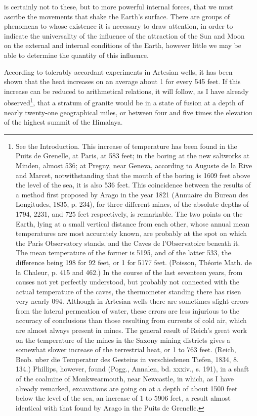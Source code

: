 is certainly not to these, but to more powerful internal forces, that we must ascribe the movements that shake the Earth's surface. There are groups of phenomena to whose existence it is necessary to draw attention, in order to indicate the universality of the influence of the attraction of the Sun and Moon on the external and internal conditions of the Earth, however little we may be able to determine the quantity of this influence.

According to tolerably accordant experiments in Artesian wells, it has been shown that the heat increases on an average about 1 for every 545 feet. If this increase can be reduced to arithmetical relations, it will follow, as I have already observed\footnote{See the Introduction. This increase of temperature has been found in the Puits de Grenelle, at Paris, at 583 feet; in the boring at the new saltworks at Minden, almost 536; at Pregny, near Geneva, according to Auguste de la Rive and Marcet, notwithstanding that the mouth of the boring is 1609 feet above the level of the sea, it is also 536 feet. This coincidence between the results of a method first proposed by Arago in the year 1821 (Annuaire du Bureau des Longitudes, 1835, p. 234), for three different mines, of the absolute depths of 1794, 2231, and 725 feet respectively, is remarkable. The two points on the Earth, lying at a small vertical distance from each other, whose annual mean temperatures are most accurately known, are probably at the spot on which the Paris Observatory stands, and the Caves de l'Observatoire beneath it. The mean temperature of the former is 5195, and of the latter 533, the difference being 198 for 92 feet, or 1 for 5177 feet. (Poisson, Th\'{e}orie Math. de la Chaleur, p. 415 and 462.) In the course of the last seventeen years, from causes not yet perfectly understood, but probably not connected with the actual temperature of the caves, the thermometer standing there has risen very nearly 094. Although in Artesian wells there are sometimes slight errors from the lateral permeation of water, these errors are less injurious to the accuracy of conclusions than those resulting from currents of cold air, which are almost always present in mines. The general result of Reich's great work on the temperature of the mines in the Saxony mining districts gives a somewhat slower increase of the terrestrial heat, or 1 to 763 feet. (Reich, Beob. uber die Temperatur des Gesteins in verschiedenen Tiefen, 1834, 8. 134.) Phillips, however, found (Pogg., Annalen, bd. xxxiv., s. 191), in a shaft of the coalmine of Monkwearmouth, near Newcastle, in which, as I have already remarked, excavations are going on at a depth of about 1500 feet below the level of the sea, an increase of 1 to 5906 feet, a result almost identical with that found by Arago in the Puits de Grenelle.}, that a stratum of granite would be in a state of fusion at a depth of nearly twenty-one geographical miles, or between four and five times the elevation of the highest summit of the Himalaya.

